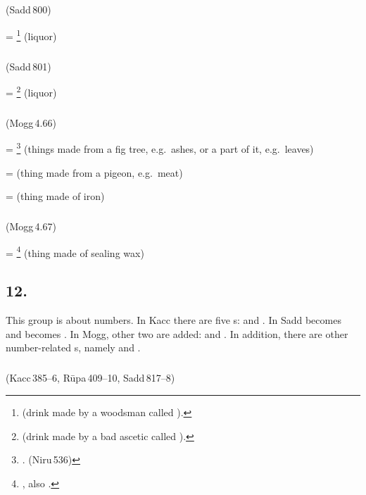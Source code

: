 \subparagraph*{} (Sadd\,800)\label{pacct11:aa}

 = \footnote{ (drink made by a woodsman called ).} (liquor) \par

\subparagraph*{} (Sadd\,801)\label{pacct11:ii}

 = \footnote{ (drink made by a bad ascetic called ).} (liquor) \par

\subparagraph*{} (Mogg\,4.66)\label{pacct11:dna}\label{pacct11:dnika}\label{pacct11:dneyya}

 = \footnote{. (Niru\,536)} (things made from a fig tree, e.g.\ ashes, or a part of it, e.g.\ leaves) \par
{} =  (thing made from a pigeon, e.g.\ meat) \par
{} =  (thing made of iron) \par

\subparagraph*{} (Mogg\,4.67)\label{pacct11:sadna}

 = \footnote{, also .} (thing made of sealing wax) \par

\subsection*{12.\ }\label{tadgroup12}\label{par:sankhyataddhita}

This group is about numbers. In Kacc there are five s:  and . In Sadd  becomes  and  becomes . In Mogg, other two are added:  and . In addition, there are other number-related s, namely  and .

\subparagraph*{} (Kacc\,385--6, R\=upa\,409--10, Sadd\,817--8)\label{pacct12:tiya}

